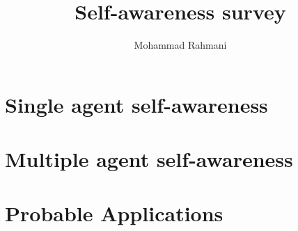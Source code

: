 \documentclass{article}
\begin{document}
	
	\title{Self-awareness survey}
	\author{Mohammad Rahmani}
	\date{}
	\maketitle
	\section{Single agent self-awareness}
	\section{Multiple agent self-awareness}
	\section{Probable Applications}
	
\end{document}
